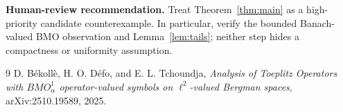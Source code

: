 \documentclass[11pt]{article}
\begin{document}
\textbf{Human-review recommendation.}  Treat Theorem~\ref{thm:main} as a
high-priority candidate counterexample.  In particular, verify the bounded
Banach-valued BMO observation and Lemma~\ref{lem:tails}; neither step hides a
compactness or uniformity assumption.

\begin{thebibliography}{9}
D. B\'ekoll\`e, H. O. D\'efo, and E. L. Tchoundja,
\emph{Analysis of Toeplitz Operators with $BMO^1_\alpha$ operator-valued
symbols on $\ell^2$-valued Bergman spaces}, arXiv:2510.19589, 2025.
\end{thebibliography}
\end{document}
